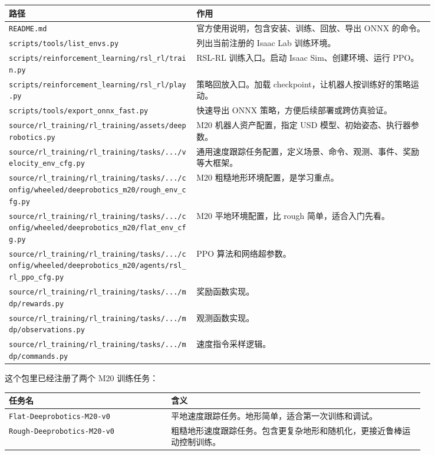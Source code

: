 \documentclass[UTF8,11pt,a4paper]{ctexart}
\begin{document}
\begin{center}
\begin{tabular}{p{0.37\linewidth}p{0.47\linewidth}}
\toprule
路径 & 作用 \\
\midrule
\texttt{README.md} & 官方使用说明，包含安装、训练、回放、导出 ONNX 的命令。\\
\texttt{scripts/tools/list\_envs.py} & 列出当前注册的 Isaac Lab 训练环境。\\
\texttt{scripts/reinforcement\_learning/rsl\_rl/train.py} & RSL-RL 训练入口。启动 Isaac Sim、创建环境、运行 PPO。\\
\texttt{scripts/reinforcement\_learning/rsl\_rl/play.py} & 策略回放入口。加载 checkpoint，让机器人按训练好的策略运动。\\
\texttt{scripts/tools/export\_onnx\_fast.py} & 快速导出 ONNX 策略，方便后续部署或跨仿真验证。\\
\texttt{source/rl\_training/rl\_training/assets/deeprobotics.py} & M20 机器人资产配置，指定 USD 模型、初始姿态、执行器参数。\\
\texttt{source/rl\_training/rl\_training/tasks/.../velocity\_env\_cfg.py} & 通用速度跟踪任务配置，定义场景、命令、观测、事件、奖励等大框架。\\
\texttt{source/rl\_training/rl\_training/tasks/.../config/wheeled/deeprobotics\_m20/rough\_env\_cfg.py} & M20 粗糙地形环境配置，是学习重点。\\
\texttt{source/rl\_training/rl\_training/tasks/.../config/wheeled/deeprobotics\_m20/flat\_env\_cfg.py} & M20 平地环境配置，比 rough 简单，适合入门先看。\\
\texttt{source/rl\_training/rl\_training/tasks/.../config/wheeled/deeprobotics\_m20/agents/rsl\_rl\_ppo\_cfg.py} & PPO 算法和网络超参数。\\
\texttt{source/rl\_training/rl\_training/tasks/.../mdp/rewards.py} & 奖励函数实现。\\
\texttt{source/rl\_training/rl\_training/tasks/.../mdp/observations.py} & 观测函数实现。\\
\texttt{source/rl\_training/rl\_training/tasks/.../mdp/commands.py} & 速度指令采样逻辑。\\
\bottomrule
\end{tabular}
\end{center}

这个包里已经注册了两个 M20 训练任务：

\begin{center}
\begin{tabular}{p{0.32\linewidth}p{0.50\linewidth}}
\toprule
任务名 & 含义 \\
\midrule
\texttt{Flat-Deeprobotics-M20-v0} & 平地速度跟踪任务。地形简单，适合第一次训练和调试。\\
\texttt{Rough-Deeprobotics-M20-v0} & 粗糙地形速度跟踪任务。包含更复杂地形和随机化，更接近鲁棒运动控制训练。\\
\bottomrule
\end{tabular}
\end{center}
\end{document}
